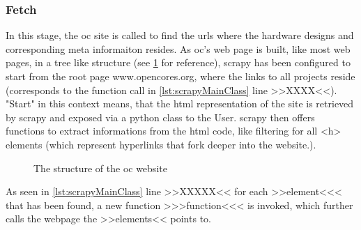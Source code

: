 \subsubsection{Fetch} 
In this stage, the \gls{oc} site is called to find the \glspl{url} where the hardware designs and corresponding meta informaiton resides. As \gls{oc}'s web page is built, like most web pages, in a tree like structure (see \cref{fig:opencoresStructure} for reference), \gls{scrapy} has been configured to start from the root page www.opencores.org, where the links to all projects reside (corresponds to the function call in \cref{lst:scrapyMainClass} line >>XXXX<<). "Start" in this context means, that the \gls{html} representation of the site is retrieved by \gls{scrapy} and exposed via a \gls{python} class to the User. \gls{scrapy} then offers functions to extract informations from the \gls{html} code, like filtering for all <h> elements (which represent \glspl{hyperlink} that fork deeper into the website.).

\begin{figure}
 \caption{The structure of the \gls{oc} website}
 \label{fig:opencoresStructure}
\end{figure}


As seen in \cref{lst:scrapyMainClass} line >>XXXXX<< for each >>element<<< that has been found, a new function >>>function<<< is invoked, which further calls the webpage the >>elements<< points to. 



